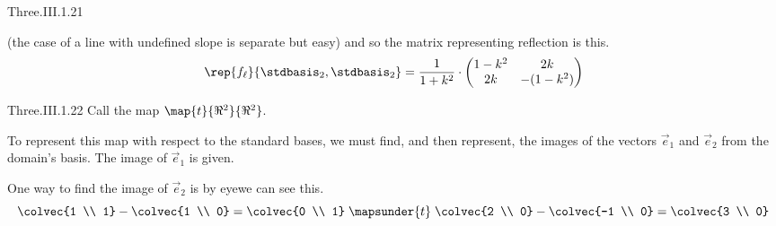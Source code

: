 \begin{ans}{Three.III.1.21}
\begin{exparts}
\begin{equation*}
       \end{equation*}
       (the case of a line with undefined slope is separate but easy)
       and so the matrix representing reflection is this.
       \begin{equation*}
         \rep{f_\ell}{\stdbasis_2,\stdbasis_2}
         =\frac{1}{1+k^2}\cdot\begin{pmatrix}
            1-k^2  &2k  \\
            2k     &-(1-k^2)
         \end{pmatrix}
       \end{equation*}
      \end{exparts}
    
\end{ans}
\begin{ans}{Three.III.1.22}
      Call the map \( \map{t}{\Re^2}{\Re^2} \).
      \begin{exparts}
        \partsitem To represent this map with respect to the standard bases, we
          must find, and then represent, the images of the vectors $\vec{e}_1$
          and $\vec{e}_2$ from the domain's basis.
          The image of $\vec{e}_1$ is given.

          One way to find the image of $\vec{e}_2$ is by
          eye\Dash we can see this.
          \begin{equation*}
            \colvec{1 \\ 1}-\colvec{1 \\ 0}=\colvec{0 \\ 1}
            \;\mapsunder{t}\;
            \colvec{2 \\ 0}-\colvec{-1 \\ 0}=\colvec{3 \\ 0}
          \end{equation*}


\end{exparts}
\end{ans}
